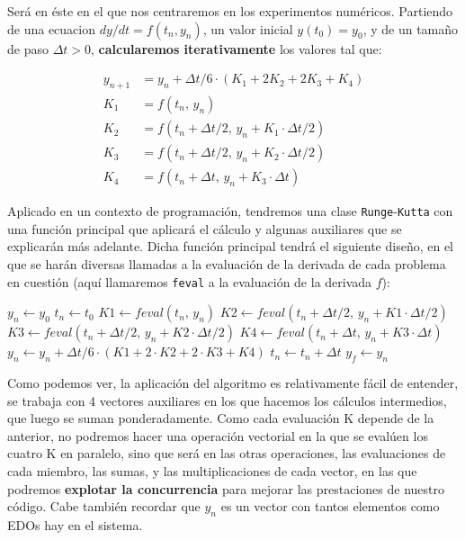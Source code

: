 Será en éste en el que nos centraremos en los experimentos numéricos. Partiendo de una ecuacion $dy/dt = f(t_n,y_n)$, un valor inicial  $y(t_0)=y_0$, y de un tamaño de paso $\Delta t > 0$, \textbf{calcularemos iterativamente} los valores tal que:

\begin{equation}
	\label{eq:RungeKutta4}
	\begin{split}
		y_{n+1} &= y_n + \Delta t/6 \cdot (K_1 + 2K_2 + 2K_3 + K_4)\\
		K_1 &= f(t_n\text{, } y_n)\\
		K_2 &= f(t_n + \Delta t/2\text{, } y_n + K_1 \cdot \Delta t/2) \\
		K_3 &= f(t_n + \Delta t/2\text{, } y_n + K_2 \cdot \Delta t/2) \\
		K_4 &= f(t_n + \Delta t\text{, } y_n + K_3 \cdot \Delta t)
	\end{split}
\end{equation}

Aplicado en un contexto de programación, tendremos una clase \texttt{Runge}-\texttt{Kutta} con una función principal que aplicará el cálculo y algunas auxiliares que se explicarán más adelante. Dicha función principal tendrá el siguiente diseño, en el que se harán diversas llamadas a la evaluación de la derivada de cada problema en cuestión (aquí llamaremos \texttt{feval} a la evaluación de la derivada $f$): 

\begin{algorithm}[H] %
	\begin{algorithmic}
		\State $y_n \gets y_0$
		\State $t_n \gets t_0$
		\State $K1 \gets feval(t_n\text{, } y_n)$ 
		\State $K2 \gets feval(t_n+\Delta t/2\text{, } y_n + K1\cdot \Delta t/2)$
		\State $K3 \gets feval(t_n+\Delta t/2\text{, } y_n + K2\cdot \Delta t/2)$
		\State $K4 \gets feval(t_n+\Delta t\text{, } y_n + K3\cdot \Delta t)$
		\State $y_n \gets y_n + \Delta t/6 \cdot (K1 + 2 \cdot K2 + 2 \cdot K3 + K4)$
		\State $t_n \gets t_n + \Delta t$
		\EndWhile
		\State $y_f \gets y_n$
	\end{algorithmic}
	\caption{Runge-Kutta de Orden 4}
	\label{alg:RungeKutta4}
\end{algorithm}

Como podemos ver, la aplicación del algoritmo es relativamente fácil de entender, se trabaja con 4 vectores auxiliares en los que hacemos los cálculos intermedios, que luego se suman ponderadamente. Como cada evaluación K depende de la anterior, no podremos hacer una operación vectorial en la que se evalúen los cuatro K en paralelo, sino que será en las otras operaciones, las evaluaciones de cada miembro, las sumas, y las multiplicaciones de cada vector, en las que podremos \textbf{explotar la concurrencia} para mejorar las prestaciones de nuestro código. Cabe también recordar que $y_n$ es un vector con tantos elementos como EDOs hay en el sistema.


